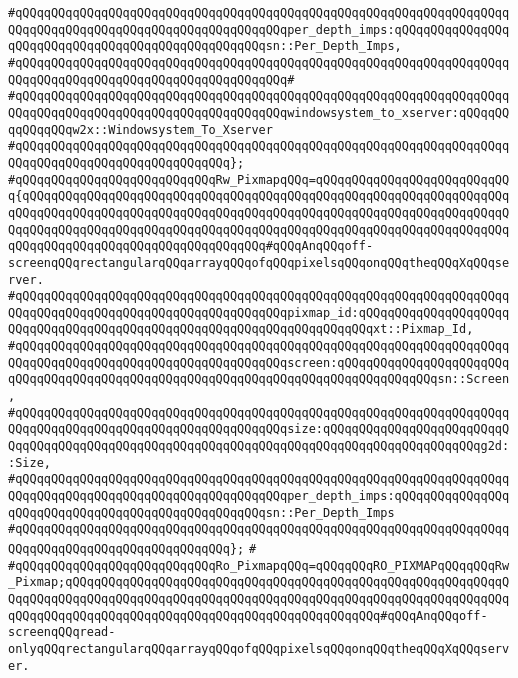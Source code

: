 \verb|#qQQqqQQqqQQqqQQqqQQqqQQqqQQqqQQqqQQqqQQqqQQqqQQqqQQqqQQqqQQqqQQqqQQqqQQqqQQqqQQqqQQqqQQqqQQqqQQqqQQqqQQqqQQqper_depth_imps:qQQqqQQqqQQqqQQqqQQqqQQqqQQqqQQqqQQqqQQqqQQqqQQqqQQqsn::Per_Depth_Imps,|\newline
\verb|#qQQqqQQqqQQqqQQqqQQqqQQqqQQqqQQqqQQqqQQqqQQqqQQqqQQqqQQqqQQqqQQqqQQqqQQqqQQqqQQqqQQqqQQqqQQqqQQqqQQqqQQqqQQq#|\newline
\verb|#qQQqqQQqqQQqqQQqqQQqqQQqqQQqqQQqqQQqqQQqqQQqqQQqqQQqqQQqqQQqqQQqqQQqqQQqqQQqqQQqqQQqqQQqqQQqqQQqqQQqqQQqqQQqwindowsystem_to_xserver:qQQqqQQqqQQqqQQqw2x::Windowsystem_To_Xserver|\newline
\verb|#qQQqqQQqqQQqqQQqqQQqqQQqqQQqqQQqqQQqqQQqqQQqqQQqqQQqqQQqqQQqqQQqqQQqqQQqqQQqqQQqqQQqqQQqqQQqqQQqqQQq};|\newline
\newline
\verb|#qQQqqQQqqQQqqQQqqQQqqQQqqQQqRw_PixmapqQQq=qQQqqQQqqQQqqQQqqQQqqQQqqQQq{qQQqqQQqqQQqqQQqqQQqqQQqqQQqqQQqqQQqqQQqqQQqqQQqqQQqqQQqqQQqqQQqqQQqqQQqqQQqqQQqqQQqqQQqqQQqqQQqqQQqqQQqqQQqqQQqqQQqqQQqqQQqqQQqqQQqqQQqqQQqqQQqqQQqqQQqqQQqqQQqqQQqqQQqqQQqqQQqqQQqqQQqqQQqqQQqqQQqqQQqqQQqqQQqqQQqqQQqqQQqqQQqqQQqqQQqqQQqqQQqqQQq#qQQqAnqQQqoff-screenqQQqrectangularqQQqarrayqQQqofqQQqpixelsqQQqonqQQqtheqQQqXqQQqserver.|\newline
\verb|#qQQqqQQqqQQqqQQqqQQqqQQqqQQqqQQqqQQqqQQqqQQqqQQqqQQqqQQqqQQqqQQqqQQqqQQqqQQqqQQqqQQqqQQqqQQqqQQqqQQqqQQqqQQqpixmap_id:qQQqqQQqqQQqqQQqqQQqqQQqqQQqqQQqqQQqqQQqqQQqqQQqqQQqqQQqqQQqqQQqqQQqqQQqxt::Pixmap_Id,|\newline
\verb|#qQQqqQQqqQQqqQQqqQQqqQQqqQQqqQQqqQQqqQQqqQQqqQQqqQQqqQQqqQQqqQQqqQQqqQQqqQQqqQQqqQQqqQQqqQQqqQQqqQQqqQQqqQQqscreen:qQQqqQQqqQQqqQQqqQQqqQQqqQQqqQQqqQQqqQQqqQQqqQQqqQQqqQQqqQQqqQQqqQQqqQQqqQQqqQQqqQQqsn::Screen,|\newline
\verb|#qQQqqQQqqQQqqQQqqQQqqQQqqQQqqQQqqQQqqQQqqQQqqQQqqQQqqQQqqQQqqQQqqQQqqQQqqQQqqQQqqQQqqQQqqQQqqQQqqQQqqQQqqQQqsize:qQQqqQQqqQQqqQQqqQQqqQQqqQQqqQQqqQQqqQQqqQQqqQQqqQQqqQQqqQQqqQQqqQQqqQQqqQQqqQQqqQQqqQQqqQQqg2d::Size,|\newline
\verb|#qQQqqQQqqQQqqQQqqQQqqQQqqQQqqQQqqQQqqQQqqQQqqQQqqQQqqQQqqQQqqQQqqQQqqQQqqQQqqQQqqQQqqQQqqQQqqQQqqQQqqQQqqQQqper_depth_imps:qQQqqQQqqQQqqQQqqQQqqQQqqQQqqQQqqQQqqQQqqQQqqQQqqQQqsn::Per_Depth_Imps|\newline
\verb|#qQQqqQQqqQQqqQQqqQQqqQQqqQQqqQQqqQQqqQQqqQQqqQQqqQQqqQQqqQQqqQQqqQQqqQQqqQQqqQQqqQQqqQQqqQQqqQQqqQQq};|\newline
\verb|#|\newline
\verb|#qQQqqQQqqQQqqQQqqQQqqQQqqQQqRo_PixmapqQQq=qQQqqQQqRO_PIXMAPqQQqqQQqRw_Pixmap;qQQqqQQqqQQqqQQqqQQqqQQqqQQqqQQqqQQqqQQqqQQqqQQqqQQqqQQqqQQqqQQqqQQqqQQqqQQqqQQqqQQqqQQqqQQqqQQqqQQqqQQqqQQqqQQqqQQqqQQqqQQqqQQqqQQqqQQqqQQqqQQqqQQqqQQqqQQqqQQqqQQqqQQqqQQqqQQqqQQqqQQq#qQQqAnqQQqoff-screenqQQqread-onlyqQQqrectangularqQQqarrayqQQqofqQQqpixelsqQQqonqQQqtheqQQqXqQQqserver.|\newline
